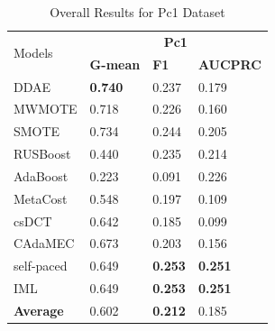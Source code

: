 \begin{table}[h]
    \centering
    \begin{tabular}{|p{}<{\centering}|p{}<{\centering}|p{}<{\centering}|p{}<{\centering}|}
    \hline
    \multirow{2}{*}{Models} & \multicolumn{3}{c|}{\textbf{Pc1}}    \\ \cline{2-4} 
                             & \textbf{G-mean} & \textbf{F1} & \textbf{AUCPRC} \\ \hline
    DDAE                     &\textbf{0.740}	&0.237	&0.179            \\ \hline
    MWMOTE                   &0.718	&0.226	&0.160            \\ \hline
    SMOTE                    &0.734	&0.244	&0.205               \\ \hline
    RUSBoost                 &0.440	&0.235	&0.214            \\ \hline
    AdaBoost                 & 0.223	&0.091	&0.226            \\ \hline
    MetaCost                 & 0.548	&0.197	&0.109            \\ \hline
    csDCT                    &0.642	&0.185	&0.099              \\ \hline
    CAdaMEC                  &0.673	&0.203	&0.156             \\ \hline
    self-paced               &0.649	&\textbf{0.253}	&\textbf{0.251}              \\ \hline
    IML                      &0.649	&\textbf{0.253}	&\textbf{0.251}          \\ \hline\hline
    \textbf{Average}         &0.602	&\textbf{0.212}	&0.185              \\ \hline
    \end{tabular}
    \vspace{-8pt}
    \caption{Overall Results for Pc1 Dataset}
    \label{tab20}
\end{table}
\vspace{-13pt}
